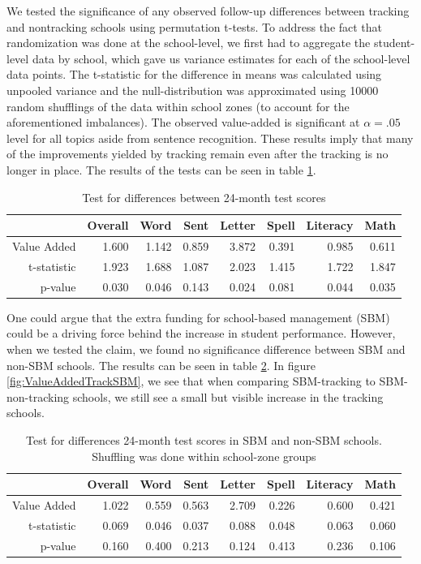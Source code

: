 \documentclass[11pt]{article}
\begin{document}
We tested the significance of any observed follow-up differences between tracking and nontracking schools using permutation t-tests. To address the fact that randomization was done at the school-level, we first had to aggregate the student-level data by school, which gave us variance estimates for each of the school-level data points.  The t-statistic for the difference in means was calculated using unpooled variance and the null-distribution was approximated using 10000 random shufflings of the data within school zones (to account for the aforementioned imbalances).  The observed value-added is significant at $ \alpha = .05 $ level for all topics aside from sentence recognition. These results imply that many of the improvements yielded by tracking remain even after the tracking is no longer in place. The results of the tests can be seen in table \ref{tab:tracking_va}.

\begin{table}[ht]
	\centering
	\begin{tabular}{rrrrrrrr}
		\hline
		& Overall & Word & Sent & Letter & Spell & Literacy & Math \\ 
		\hline
		Value Added & 1.600 & 1.142 & 0.859 & 3.872 & 0.391 & 0.985 & 0.611 \\ 
		t-statistic & 1.923 & 1.688 & 1.087 & 2.023 & 1.415 & 1.722 & 1.847 \\ 
		p-value & 0.030 & 0.046 & 0.143 & 0.024 & 0.081 & 0.044 & 0.035 \\ 
		\hline
	\end{tabular}
	\label{tab:tracking_va}
	\caption{Test for differences between 24-month test scores} 
\end{table}

One could argue that the extra funding for school-based management (SBM) could be a driving force behind the increase in student performance.  However, when we tested the claim, we found no significance difference between SBM and non-SBM schools.  The results can be seen in table \ref{tab:sbm}.  In figure \ref{fig:ValueAddedTrackSBM}, we see that when comparing SBM-tracking to SBM-non-tracking schools, we still see a small but visible increase in the tracking schools.

\begin{table}[ht]
	\centering
	\begin{tabular}{rrrrrrrr}
		\hline
		& Overall & Word & Sent & Letter & Spell & Literacy & Math \\ 
		\hline
		Value Added & 1.022 & 0.559 & 0.563 & 2.709 & 0.226 & 0.600 & 0.421 \\ 
		t-statistic & 0.069 & 0.046 & 0.037 & 0.088 & 0.048 & 0.063 & 0.060 \\ 
		p-value & 0.160 & 0.400 & 0.213 & 0.124 & 0.413 & 0.236 & 0.106 \\ 
		\hline
	\end{tabular}
	\caption{Test for differences 24-month test scores in SBM and non-SBM schools.  
		Shuffling was done within school-zone groups} 
	\label{tab:sbm}
\end{table}
\end{document}
